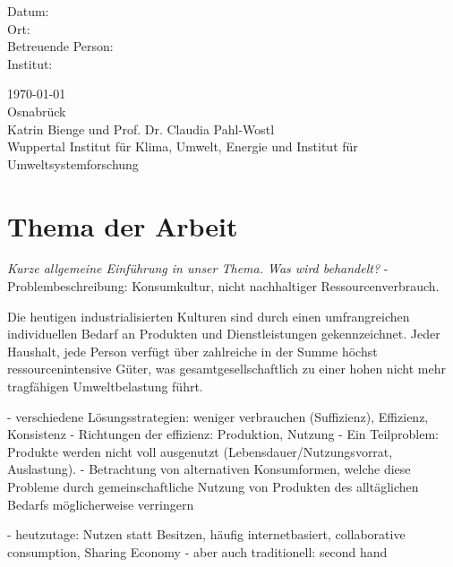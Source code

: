 \documentclass[11pt, titlepage=true]{scrartcl} %
\newcommand{\was}[1]{\small\textit{#1}}
\newcommand{\betreuung}{Katrin Bienge und Prof. Dr. Claudia Pahl-Wostl}
\newcommand{\institut}{Wuppertal Institut für Klima, Umwelt, Energie und Institut für Umweltsystemforschung}
\newcommand{\ort}{Osnabrück}
\begin{document}
\begin{titlepage}
\begin{center}
      \vfill
{}
      \begin{minipage}[t]{0.45\textwidth}
        \begin{flushright}
          Datum:              \\[1.2ex]
          Ort:                \\[1.2ex]
          Betreuende Person:  \\[1.2ex]
          Institut:           \\[3ex]
        \end{flushright}
      \end{minipage}
      \hspace{0.01\textwidth}
      \begin{minipage}[t]{0.45\textwidth}
        \begin{flushleft}
          \today\\[1.2ex]
          \ort\\[1.2ex]
          \betreuung\\[1.2ex]
          \institut \\[3ex]
        \end{flushleft}
      \end{minipage}
  \end{center}
\end{titlepage}
\tableofcontents
\section{Thema der Arbeit}
\was{Kurze allgemeine Einführung in unser Thema. Was wird behandelt?}
- Problembeschreibung: Konsumkultur, nicht nachhaltiger Ressourcenverbrauch. 

Die heutigen industrialisierten Kulturen sind durch einen umfrangreichen individuellen
Bedarf an Produkten und Dienstleistungen gekennzeichnet. Jeder Haushalt, jede
Person verfügt über zahlreiche in der Summe höchst ressourcenintensive Güter,
was gesamtgesellschaftlich zu einer hohen nicht mehr tragfähigen Umweltbelastung
führt.

- verschiedene Lösungsstrategien: weniger verbrauchen (Suffizienz), Effizienz,
Konsistenz
- Richtungen der effizienz: Produktion, Nutzung
- Ein Teilproblem: Produkte werden nicht voll ausgenutzt (Lebensdauer/Nutzungsvorrat, Auslastung).
- Betrachtung von alternativen Konsumformen, welche diese Probleme durch gemeinschaftliche Nutzung von Produkten des alltäglichen Bedarfs möglicherweise verringern

- heutzutage: Nutzen statt Besitzen, häufig internetbasiert, collaborative consumption, Sharing Economy
- aber auch traditionell: second hand
\end{document}
